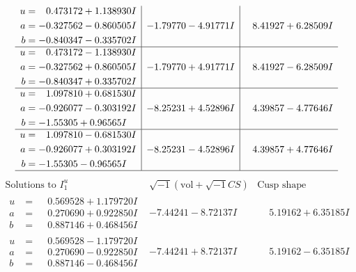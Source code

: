 \documentclass[1p]{elsarticle_modified}
\theoremstyle{definition}
\newcommand{\I}{\sqrt{-1}}
\begin{document}
$$\begin{array}{c|c|c}
\begin{aligned}
u &= \phantom{-}0.473172 + 1.138930 I \\
a &= -0.327562 - 0.860505 I \\
b &= -0.840347 - 0.335702 I\end{aligned}
 & -1.79770 - 4.91771 I & \phantom{-}8.41927 + 6.28509 I \\ \hline\begin{aligned}
u &= \phantom{-}0.473172 - 1.138930 I \\
a &= -0.327562 + 0.860505 I \\
b &= -0.840347 + 0.335702 I\end{aligned}
 & -1.79770 + 4.91771 I & \phantom{-}8.41927 - 6.28509 I \\ \hline\begin{aligned}
u &= \phantom{-}1.097810 + 0.681530 I \\
a &= -0.926077 - 0.303192 I \\
b &= -1.55305 + 0.96565 I\end{aligned}
 & -8.25231 + 4.52896 I & \phantom{-}4.39857 - 4.77646 I \\ \hline\begin{aligned}
u &= \phantom{-}1.097810 - 0.681530 I \\
a &= -0.926077 + 0.303192 I \\
b &= -1.55305 - 0.96565 I\end{aligned}
 & -8.25231 - 4.52896 I & \phantom{-}4.39857 + 4.77646 I\\
 \hline 
 \end{array}$$\newpage$$\begin{array}{c|c|c}  
\text{Solutions to }I^u_{1}& \I (\text{vol} + \sqrt{-1}CS) & \text{Cusp shape}\\
 \hline 
\begin{aligned}
u &= \phantom{-}0.569528 + 1.179720 I \\
a &= \phantom{-}0.270690 + 0.922850 I \\
b &= \phantom{-}0.887146 + 0.468456 I\end{aligned}
 & -7.44241 - 8.72137 I & \phantom{-}5.19162 + 6.35185 I \\ \hline\begin{aligned}
u &= \phantom{-}0.569528 - 1.179720 I \\
a &= \phantom{-}0.270690 - 0.922850 I \\
b &= \phantom{-}0.887146 - 0.468456 I\end{aligned}
 & -7.44241 + 8.72137 I & \phantom{-}5.19162 - 6.35185 I \\ \hline\begin{aligned}

\end{aligned}
\end{array}$$
\end{document}
